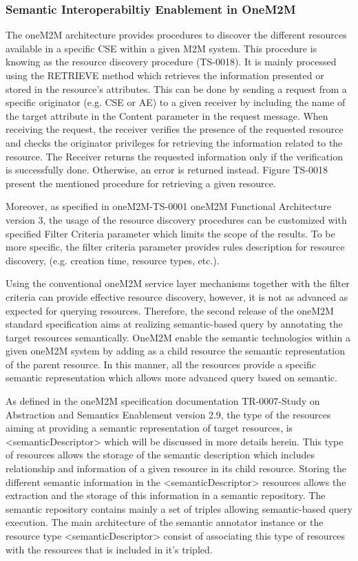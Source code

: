 \subsubsection{Semantic Interoperabiltiy Enablement in OneM2M}
The oneM2M architecture provides procedures to discover the different resources available in a specific CSE within a given M2M system. This procedure is knowing as the resource discovery procedure (TS-0018). It is mainly processed using the RETRIEVE method which retrieves the information presented or stored in the resource's attributes. This can be done by sending a request from a specific originator (e.g. CSE or AE) to a given receiver by including the name of the target attribute in the Content parameter in the request message. When receiving the request, the receiver verifies the presence of the requested resource and checks the originator privileges for retrieving the information related to the resource. The Receiver returns the requested information only if the verification is successfully done. Otherwise, an error is returned instead. Figure TS-0018 present the mentioned procedure for retrieving a given resource.\par
Moreover, as specified in oneM2M-TS-0001 oneM2M Functional Architecture version 3, the usage of the resource discovery procedures can be customized with specified Filter Criteria parameter which limits the scope of the results. To be more specific, the filter criteria parameter provides rules description for resource discovery, (e.g. creation time, resource types, etc.).\par
Using the conventional oneM2M service layer mechanisms together with the filter criteria can provide effective resource discovery, however, it is not as advanced as expected for querying resources. Therefore, the second release of the oneM2M standard specification aims at realizing semantic-based query by annotating the target resources semantically. OneM2M enable the semantic technologies within a given oneM2M system by adding as a child resource the semantic representation of the parent resource. In this manner, all the resources provide a specific semantic representation which allows more advanced query based on semantic.\par
As defined in the oneM2M specification documentation TR-0007-Study on Abstraction and Semantics Enablement version 2.9, the type of the resources aiming at providing a semantic representation of target resources, is <semanticDescriptor> which will be discussed in more details herein. This type of resources allows the storage of the semantic description which includes relationship and information of a given resource in its child resource. Storing the different semantic information in the <semanticDescriptor> resources allows the extraction and the storage of this information in a semantic repository. The semantic repository contains mainly a set of triples allowing semantic-based query execution. The main architecture of the semantic annotator instance or the resource type <semanticDescriptor> consist of associating this type of resources with the resources that is included in it's tripled. \par
